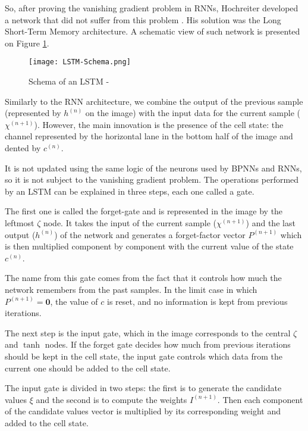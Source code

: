 So, after proving the vanishing gradient problem in RNNs, Hochreiter developed a network that did not suffer from this problem \cite{hochreiter1997long}.
His solution was the Long Short-Term Memory architecture.
A schematic view of such network is presented on Figure \ref{fig:LSTMSchema}.

\begin{figure}
    \begin{center}
        \texttt{[image: LSTM-Schema.png]}
        \caption[Schema of an LSTM]{Schema of an LSTM - \cite{rahman2019nonintrusive}}
        \label{fig:LSTMSchema}
    \end{center}
\end{figure}

Similarly to the RNN architecture, we combine the output of the previous sample (represented by $h^{(n)}$ on the image) with the input data for the current sample ($\chi^{(n+1)}$).
However, the main innovation is the presence of the cell state: the channel represented by the horizontal lane in the bottom half of the image and dented by $c^{(n)}$.

It is not updated using the same logic of the neurons used by BPNNs and RNNs, so it is not subject to the vanishing gradient problem.
The operations performed by an LSTM can be explained in three steps, each one called a gate.

The first one is called the forget-gate and is represented in the image by the leftmost $\zeta$ node.
It takes the input of the current sample ($\chi^{(n+1)}$) and the last output ($h^{(n)}$) of the network and generates a forget-factor vector $P^{(n+1)}$ which is then multiplied component by component with the current value of the state $c^{(n)}$.

The name from this gate comes from the fact that it controls how much the network remembers from the past samples.
In the limit case in which $P^{(n+1)} = \mathbf{0}$, the value of $c$ is reset, and no information is kept from previous iterations.

The next step is the input gate, which in the image corresponds to the central $\zeta$ and $\tanh$ nodes.
If the forget gate decides how much from previous iterations should be kept in the cell state, the input gate controls which data from the current one should be added to the cell state.

The input gate is divided in two steps: the first is to generate the candidate values $\xi$ and the second is to compute the weights $I^{(n+1)}$.
Then each component of the candidate values vector is multiplied by its corresponding weight and added to the cell state.

